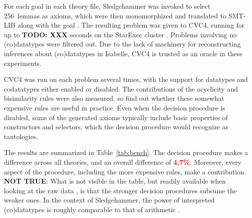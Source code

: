 For each goal in each theory file, Sledgehammer was invoked to select
256~lemmas as axioms, which were then monomorphized and translated to SMT-LIB
along with the goal \cite{boehme-2012-phd}. The resulting problem was given to
CVC4, running for up to \textbf{TODO: XXX} seconds on the StarExec cluster
\cite{xxx}. Problems involving no (co)datatypes were filtered out.
Due to the lack of machinery for reconstructing inferences about (co)datatypes
in Isabelle, CVC4 is trusted as an oracle in these experiments.

CVC4 was run on each problem several times, with the support for datatypes and
codatatypes either enabled or disabled. The contributions of the acyclicity and
bisimilarity rules were also measured, so find out whether these somewhat
expensive rules are useful in practice. Even when the decision procedure is
disabled, some of the generated axioms typically include basic properties of
constructors and selectors, which the decision procedure would recognize as
tautologies.

\newcommand\BAD[1]{\textcolor{red}{\textbf{#1}}}



The results are summarized in Table~\ref{tab:bench}. The decision procedure
makes a difference across all theories, and an overall difference of
\BAD{4.7\%}. Moreover, every aspect of the procedure, including the more
expensive rules, make a contribution. \textbf{NOT TRUE}: What is not visible in the table, but
readily available when looking at the raw data \cite{our-eval-data}, is that
the stronger decision procedures subsume the weaker ones. In the context of
Sledgehammer, the power of interpreted (co)datatypes is roughly
comparable to that of arithmetic \cite{blanchette-et-al-2013-smt}.


